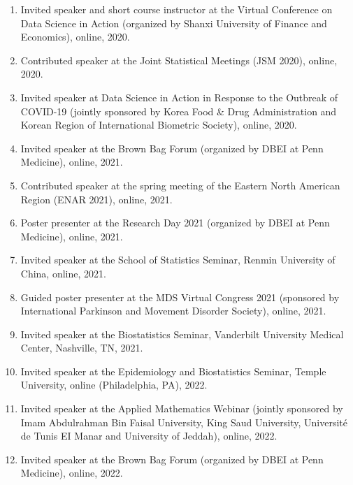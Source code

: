 \documentclass[12pt]{article}
\begin{document}
\begin{enumerate}
		\item Invited speaker and short course instructor at the Virtual Conference on Data Science in Action (organized by Shanxi 	University of Finance and Economics), online, 2020.
		
		\item Contributed speaker at the Joint Statistical Meetings 
		(JSM 2020), online, 2020.
		
		\item Invited speaker at Data Science in Action in Response to the Outbreak of COVID-19 (jointly sponsored by Korea Food \& Drug Administration and	Korean Region of International Biometric Society), online, 2020.
		
		\item Invited speaker at the Brown Bag Forum (organized by DBEI at Penn Medicine), online, 2021.
		
		\item Contributed speaker at the spring meeting of the Eastern North American Region (ENAR 2021), online, 2021.
		
		\item Poster presenter at the Research Day 2021 (organized by DBEI at Penn Medicine), online, 2021.
		
		\item Invited speaker at the School of Statistics Seminar, 
		Renmin University of China, online, 2021.
		
		\item Guided poster presenter at the MDS Virtual Congress 
		2021 (sponsored by International Parkinson and Movement 
		Disorder Society), online, 2021.
		
		\item Invited speaker at the Biostatistics Seminar, 
		Vanderbilt University Medical Center, Nashville, TN, 2021.
		
		\item Invited speaker at the Epidemiology and Biostatistics 
		Seminar, Temple University, online (Philadelphia, PA), 2022.
		
		\item Invited speaker at the Applied Mathematics Webinar 
		(jointly sponsored by Imam Abdulrahman Bin Faisal University, King Saud University, Universit\'{e} de Tunis EI Manar and University of Jeddah), online, 2022.
		
		\item Invited speaker at the Brown Bag Forum (organized by DBEI at Penn Medicine), online, 2022.
		

\end{enumerate}
\end{document}
